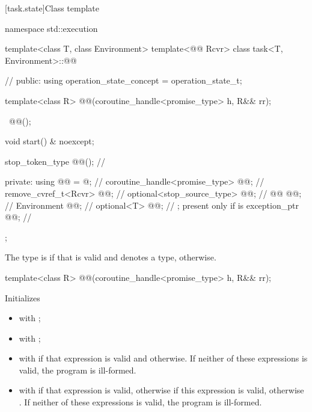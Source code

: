 [task.state]{Class template }

\begin{codeblock}
namespace std::execution {
  template<class T, class Environment>
  template<@@ Rcvr>
  class task<T, Environment>::@@ {           // \expos
  public:
    using operation_state_concept = operation_state_t;

    template<class R>
      @@(coroutine_handle<promise_type> h, R&& rr);

    ~@@();

    void start() & noexcept;

    stop_token_type @@();           // \expos

  private:
    using @@ = @\seebelownc@;                // \expos
    coroutine_handle<promise_type> @@;      // \expos
    remove_cvref_t<Rcvr>           @@;        // \expos
    optional<stop_source_type>     @@;      // \expos
    @@                      @@;     // \expos
    Environment                    @@; // \expos
    optional<T>                    @@;      // \expos; present only if  is 
    exception_ptr                  @@;       // \expos
  };
}
\end{codeblock}

\pnum
The type  is  if that
 is valid and denotes a type,  otherwise.

%
\begin{itemdecl}
template<class R>
  @@(coroutine_handle<promise_type> h, R&& rr);
\end{itemdecl}
\begin{itemdescr}
\pnum
\effects
Initializes
\begin{itemize}
\item {} with ;
\item {} with ;
\item {}
with  if that expression
is valid and  otherwise.
If neither of these expressions is valid, the program is ill-formed.
\item {} with
 if that expression is
valid, otherwise 
if this expression is valid, otherwise .
If neither of these expressions is valid, the program is ill-formed.
\end{itemize}
\end{itemdescr}

